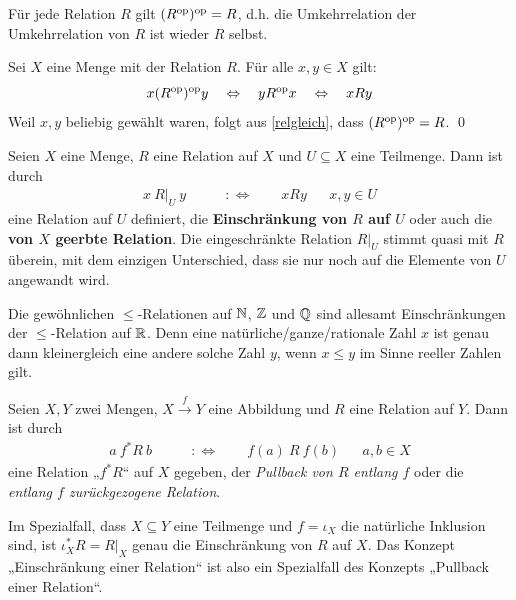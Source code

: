 \begin{bem}[*]
    Für jede Relation $R$ gilt $(R^{\mathrm{op}})^{\mathrm{op}}=R$, d.h. die Umkehrrelation der Umkehrrelation von $R$ ist wieder $R$ selbst.
\end{bem}


\begin{bew}
    Sei $X$ eine Menge mit der Relation $R$. Für alle $x,y\in X$ gilt:
        \[ x(R^{\mathrm{op}})^{\mathrm{op}} y \quad\Leftrightarrow\quad yR^{\mathrm{op}} x \quad\Leftrightarrow\quad xRy  \]
    Weil $x,y$ beliebig gewählt waren, folgt aus \cref{relgleich}, dass $(R^{\mathrm{op}})^{\mathrm{op}} = R$. \qed
\end{bew}


\begin{defin} 
    Seien $X$ eine Menge, $R$ eine Relation auf $X$ und $U\subseteq X$ eine Teilmenge. Dann ist durch
    \begin{align*}
        x\ R\vert_U\ y \qquad& :\Leftrightarrow\qquad xRy &&x,y\in U
    \end{align*}
    eine Relation auf $U$ definiert, die \textbf{Einschränkung von $R$ auf $U$} oder auch die \textbf{von $X$ geerbte Relation}. Die eingeschränkte Relation $R\vert_U$ stimmt quasi mit $R$ überein, mit dem einzigen Unterschied, dass sie nur noch auf die Elemente von $U$ angewandt wird.
\end{defin}


\begin{bsp}
    Die gewöhnlichen $\le$-Relationen auf $\mathbb N$, $\mathbb Z$ und $\mathbb Q$ sind allesamt Einschränkungen der $\le$-Relation auf $\mathbb R$. Denn eine natürliche/ganze/rationale Zahl $x$ ist genau dann kleinergleich eine andere solche Zahl $y$, wenn $x\le y$ im Sinne reeller Zahlen gilt.
\end{bsp}


\begin{bem} \label{pullbackrel}
    Seien $X,Y$ zwei Mengen, $X\xrightarrow{f} Y$ eine Abbildung und $R$ eine Relation auf $Y$. Dann ist durch
    \begin{align*}
        a\ f^*R\ b \qquad& :\Leftrightarrow\qquad f(a)\ R\ f(b) &&a,b\in X
    \end{align*}
    eine Relation „$f^*R$“ auf $X$ gegeben, der \emph{Pullback von $R$ entlang $f$} oder die \emph{entlang $f$ zurückgezogene Relation}.

    Im Spezialfall, dass $X\subseteq Y$ eine Teilmenge und $f=\iota_X$ die natürliche Inklusion sind, ist $\iota_X^*R=R\vert_X$ genau die Einschränkung von $R$ auf $X$. Das Konzept „Einschränkung einer Relation“ ist also ein Spezialfall des Konzepts „Pullback einer Relation“.
\end{bem}


